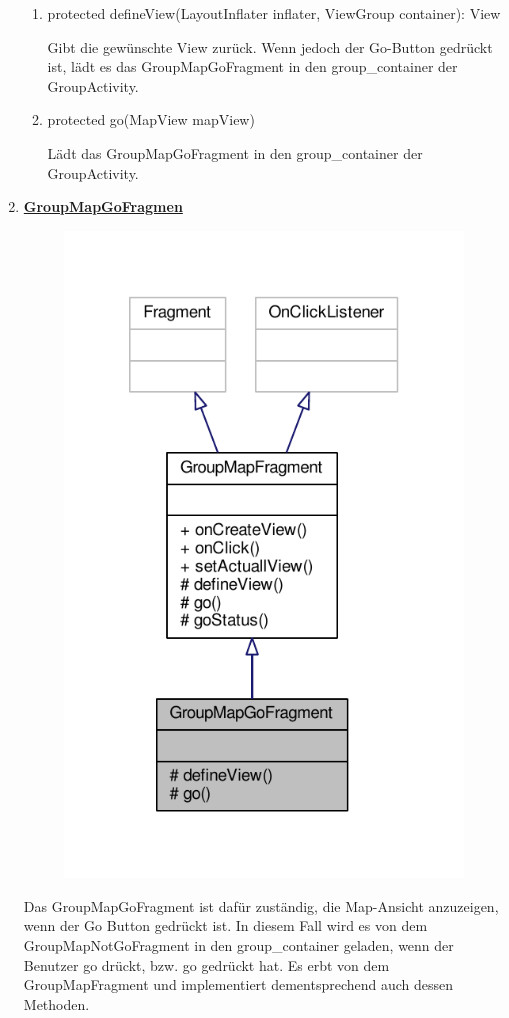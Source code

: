 \begin{enumerate}
\begin{enumerate}
		\item protected defineView(LayoutInflater inflater, ViewGroup container): View

		Gibt die gewünschte View zurück. Wenn jedoch der Go-Button gedrückt ist, lädt es das GroupMapGoFragment in den group\_container der GroupActivity.
		
		\item protected go(MapView mapView)
		
		Lädt das GroupMapGoFragment in den group\_container der GroupActivity.
	\end{enumerate}
			
	\item \textbf{\underline{GroupMapGoFragmen}}

	\begin{figure}[H]
		\includegraphics[scale = 1]{res/group_map_go_fragment__inherit__graph.pdf}
		\centering
	\end{figure}
		Das GroupMapGoFragment ist dafür zuständig, die Map-Ansicht anzuzeigen, wenn der Go Button gedrückt ist. In diesem Fall wird es von dem GroupMapNotGoFragment in den group\_container geladen, wenn der Benutzer go drückt, bzw. go gedrückt hat. Es erbt von dem GroupMapFragment und implementiert dementsprechend auch dessen Methoden.


\end{enumerate}
